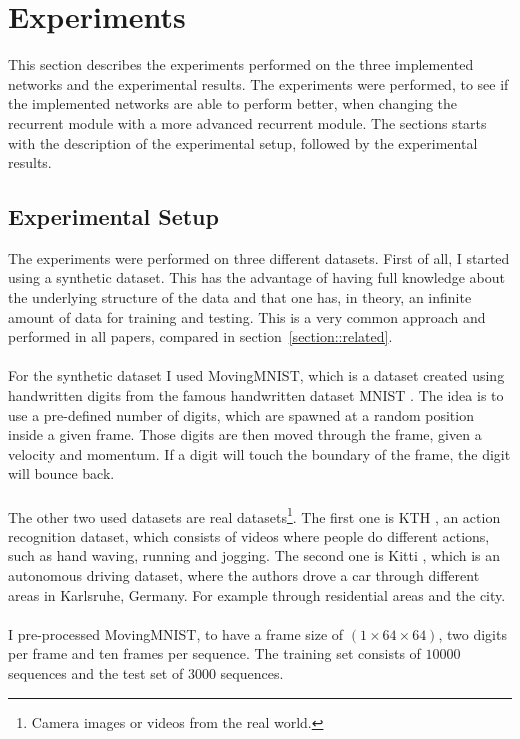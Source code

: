 \section{Experiments} \label{section::experiments}
 This section describes the experiments performed on the three implemented networks and the experimental results. The experiments were performed, to see 
 if the implemented networks are able to perform better, when changing the recurrent module with a more advanced recurrent module. The sections starts with 
 the description of the experimental setup, followed by the experimental results.
 
 \subsection{Experimental Setup}
  The experiments were performed on three different datasets. First of all, I started using a synthetic dataset. This has the advantage of having full knowledge
  about the underlying structure of the data and that one has, in theory, an infinite amount of data for training and testing. This is a very common approach
  and performed in all papers, compared in section~\ref{section::related}.
  \\\\
  For the synthetic dataset I used MovingMNIST, which is a dataset created using handwritten digits from the famous handwritten dataset MNIST
  \cite{LeCun1998}. The idea is to use a pre-defined number of digits, which are spawned at a random position inside a given frame. Those digits are then moved 
  through the frame, given a velocity and momentum. If a digit will touch the boundary of the frame, the digit will bounce back.
  \\\\  
  The other two used datasets are real datasets\footnote{Camera images or videos from the real world.}.
  The first one is KTH \cite{Schuldt2004}, an action recognition dataset, which consists of videos where people
  do different actions, such as hand waving, running and jogging. The second one is Kitti \cite{Geiger2013}, which is an autonomous driving dataset, where
  the authors drove a car through different areas in Karlsruhe, Germany. For example through residential areas and the city.
  \\\\
  I pre-processed MovingMNIST, to have a frame size of $(1 \times 64 \times 64)$, two digits per frame and ten frames per sequence.
  The training set consists of $10000$ sequences and the test set of $3000$ sequences.\\

